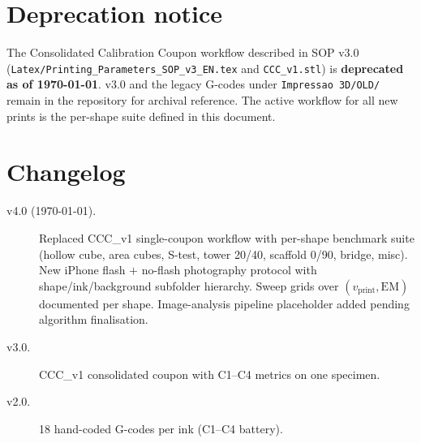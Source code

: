\documentclass[11pt,a4paper]{article}
\begin{document}
\section{Deprecation notice}

The Consolidated Calibration Coupon workflow described in
SOP v3.0 (\texttt{Latex/Printing\_Parameters\_SOP\_v3\_EN.tex}
and \texttt{CCC\_v1.stl}) is \textbf{deprecated as of
\today}. v3.0 and the legacy G-codes under
\texttt{Impressao 3D/OLD/} remain in the repository for
archival reference. The active workflow for all new prints is
the per-shape suite defined in this document.

\section{Changelog}

\begin{description}
\item[v4.0 (\today).] Replaced CCC\_v1 single-coupon workflow with
per-shape benchmark suite (hollow cube, area cubes, S-test,
tower 20/40, scaffold 0/90, bridge, misc). New iPhone flash $+$
no-flash photography protocol with shape/ink/background
subfolder hierarchy. Sweep grids over $(v_\mathrm{print},
\mathrm{EM})$ documented per shape. Image-analysis pipeline
placeholder added pending algorithm finalisation.
\item[v3.0.] CCC\_v1 consolidated coupon with C1--C4 metrics on one specimen.
\item[v2.0.] 18 hand-coded G-codes per ink (C1--C4 battery).
\end{description}
\end{document}
